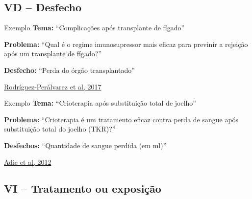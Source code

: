 \documentclass{beamer}
\begin{document}
\subsection{VD -- Desfecho}

\begin{frame}
  \begin{exampleblock}{Exemplo}
    \tiny
    {\bf Tema: }``Complicações após transplante de fígado''

    \bigskip

    {\bf Problema:} ``Qual é o regime imunosupressor mais eficaz para previnir a rejeição após um transplante de fígado?''

    \bigskip
    \normalsize
    {\bf Desfecho:} ``Perda do órgão transplantado''
  \end{exampleblock}

  \vfill
  \scriptsize
  \hfill \href{https://doi.org/10.1002/14651858.cd011639.pub2}{Rodríguez‐Perálvarez et al, 2017}
\end{frame}

\begin{frame}
  \begin{exampleblock}{Exemplo}
    \tiny
    {\bf Tema: }``Crioterapia após substituição total de joelho''

    \bigskip

    {\bf Problema:} ``Crioterapia é um tratamento eficaz contra perda de sangue após substituição total do joelho (TKR)?''

    \bigskip
    \normalsize
    {\bf Desfechos:} ``Quantidade de sangue perdida (em ml)''
  \end{exampleblock}

  \vfill
  \scriptsize
  \hfill \href{https://doi.org/10.1002/14651858.CD007911.pub2}{Adie et al, 2012}
\end{frame}

\subsection{VI -- Tratamento ou exposição}
\end{document}
